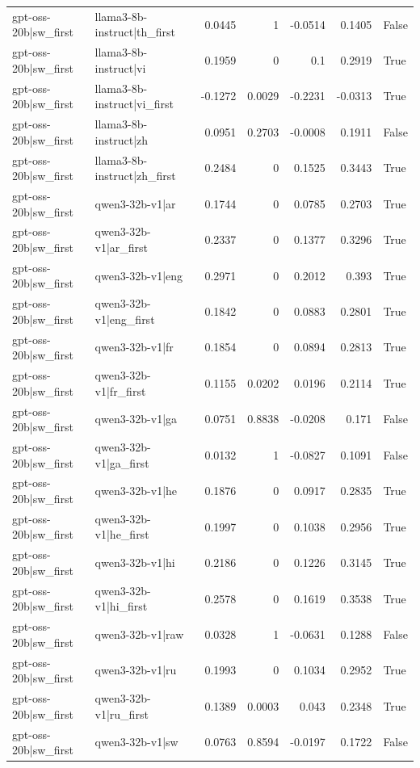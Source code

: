 \begin{table}
\begin{tabular}{l l r r r r l}
gpt-oss-20b|sw_first & llama3-8b-instruct|th_first & 0.0445 & 1 & -0.0514 & 0.1405 & False \\
gpt-oss-20b|sw_first & llama3-8b-instruct|vi & 0.1959 & 0 & 0.1 & 0.2919 & True \\
gpt-oss-20b|sw_first & llama3-8b-instruct|vi_first & -0.1272 & 0.0029 & -0.2231 & -0.0313 & True \\
gpt-oss-20b|sw_first & llama3-8b-instruct|zh & 0.0951 & 0.2703 & -0.0008 & 0.1911 & False \\
gpt-oss-20b|sw_first & llama3-8b-instruct|zh_first & 0.2484 & 0 & 0.1525 & 0.3443 & True \\
gpt-oss-20b|sw_first & qwen3-32b-v1|ar & 0.1744 & 0 & 0.0785 & 0.2703 & True \\
gpt-oss-20b|sw_first & qwen3-32b-v1|ar_first & 0.2337 & 0 & 0.1377 & 0.3296 & True \\
gpt-oss-20b|sw_first & qwen3-32b-v1|eng & 0.2971 & 0 & 0.2012 & 0.393 & True \\
gpt-oss-20b|sw_first & qwen3-32b-v1|eng_first & 0.1842 & 0 & 0.0883 & 0.2801 & True \\
gpt-oss-20b|sw_first & qwen3-32b-v1|fr & 0.1854 & 0 & 0.0894 & 0.2813 & True \\
gpt-oss-20b|sw_first & qwen3-32b-v1|fr_first & 0.1155 & 0.0202 & 0.0196 & 0.2114 & True \\
gpt-oss-20b|sw_first & qwen3-32b-v1|ga & 0.0751 & 0.8838 & -0.0208 & 0.171 & False \\
gpt-oss-20b|sw_first & qwen3-32b-v1|ga_first & 0.0132 & 1 & -0.0827 & 0.1091 & False \\
gpt-oss-20b|sw_first & qwen3-32b-v1|he & 0.1876 & 0 & 0.0917 & 0.2835 & True \\
gpt-oss-20b|sw_first & qwen3-32b-v1|he_first & 0.1997 & 0 & 0.1038 & 0.2956 & True \\
gpt-oss-20b|sw_first & qwen3-32b-v1|hi & 0.2186 & 0 & 0.1226 & 0.3145 & True \\
gpt-oss-20b|sw_first & qwen3-32b-v1|hi_first & 0.2578 & 0 & 0.1619 & 0.3538 & True \\
gpt-oss-20b|sw_first & qwen3-32b-v1|raw & 0.0328 & 1 & -0.0631 & 0.1288 & False \\
gpt-oss-20b|sw_first & qwen3-32b-v1|ru & 0.1993 & 0 & 0.1034 & 0.2952 & True \\
gpt-oss-20b|sw_first & qwen3-32b-v1|ru_first & 0.1389 & 0.0003 & 0.043 & 0.2348 & True \\
gpt-oss-20b|sw_first & qwen3-32b-v1|sw & 0.0763 & 0.8594 & -0.0197 & 0.1722 & False \\

\end{tabular}
\end{table}
